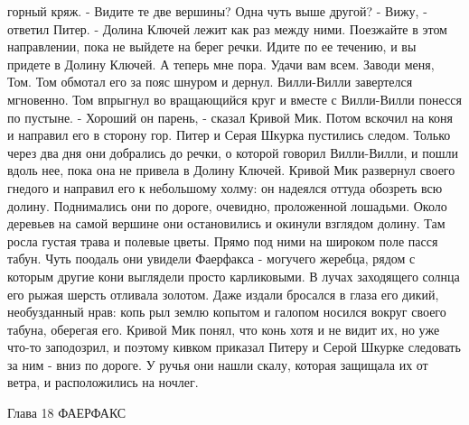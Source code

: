 горный кряж.
    - Видите те две вершины? Одна чуть выше другой?
    - Вижу, - ответил Питер.
    - Долина Ключей лежит как раз между ними. Поезжайте в этом 
направлении, пока не выйдете на берег речки. Идите по ее течению, и вы 
придете в Долину Ключей. А теперь мне пора. Удачи вам всем. Заводи 
меня, Том.
    Том обмотал его за пояс шнуром и дернул. Вилли-Вилли завертелся 
мгновенно. Том впрыгнул во вращающийся круг и вместе с Вилли-Вилли 
понесся по пустыне.
    - Хороший он парень, - сказал Кривой Мик. Потом вскочил на коня и 
направил его в сторону гор. Питер и Серая Шкурка пустились следом.
    Только через два дня они добрались до речки, о которой говорил 
Вилли-Вилли, и пошли вдоль нее, пока она не привела в Долину Ключей.
    Кривой Мик развернул своего гнедого и направил его к небольшому 
холму: он надеялся оттуда обозреть всю долину. Поднимались они по 
дороге, очевидно, проложенной лошадьми. Около деревьев на самой 
вершине они остановились и окинули взглядом долину. Там росла густая 
трава и полевые цветы.
    Прямо под ними на широком поле пасся табун. Чуть поодаль они 
увидели Фаерфакса - могучего жеребца, рядом с которым другие кони 
выглядели просто карликовыми. В лучах заходящего солнца его рыжая 
шерсть отливала золотом. Даже издали бросался в глаза его дикий, 
необузданный нрав: копь рыл землю копытом и галопом носился вокруг 
своего табуна, оберегая его.
    Кривой Мик понял, что конь хотя и не видит их, но уже что-то 
заподозрил, и поэтому кивком приказал Питеру и Серой Шкурке следовать 
за ним - вниз по дороге. У ручья они нашли скалу, которая защищала их 
от ветра, и расположились на ночлег.

        Глава 18
        ФАЕРФАКС

